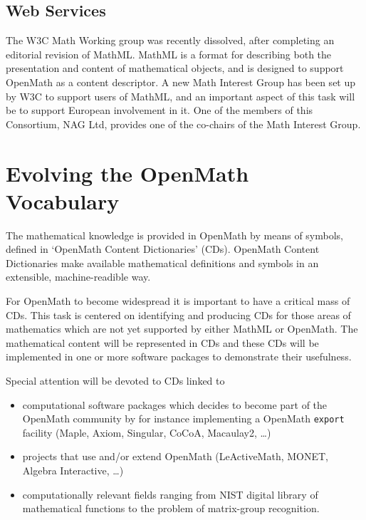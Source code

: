 \documentclass[draft]{artikel3}
\begin{document}
\subsection{Web Services}
\label{sec:ws}





The W3C Math Working group was recently dissolved, after completing an
editorial revision of MathML.  MathML is a format for describing both
the presentation and content of mathematical objects, and is designed
to support OpenMath as a content descriptor.  A new Math Interest
Group has been set up by W3C to support users of MathML, and an
important aspect of this task will be to support European involvement
in it.  One of the members of this Consortium, NAG Ltd, provides one
of the co-chairs of the Math Interest Group.

\section{Evolving the OpenMath Vocabulary}
\label{sec:OCD}

The mathematical knowledge is provided in OpenMath by means of
symbols, defined in `OpenMath Content Dictionaries' (CDs).  OpenMath
Content Dictionaries make available mathematical definitions and
symbols in an extensible, machine-readible way.

For OpenMath to become widespread it is important to have a critical
mass of CDs. This task is centered on identifying and producing CDs
for those areas of mathematics which are not yet supported by either
MathML or OpenMath. The mathematical content will be represented in
CDs and these CDs will be implemented in one or more software packages
to demonstrate their usefulness.

Special attention will be devoted to CDs linked to 
\begin{itemize}
  
\item computational software packages which decides to become part of
  the OpenMath community by for instance implementing a OpenMath
  \texttt{export} facility (Maple, Axiom, Singular, CoCoA, Macaulay2,
  \ldots)
  
\item projects that use and/or extend OpenMath (LeActiveMath, MONET,
  Algebra Interactive, \ldots)
  
\item computationally relevant fields ranging from NIST digital
  library of mathematical functions to the problem of matrix-group
  recognition.

\end{itemize}
\end{document}
